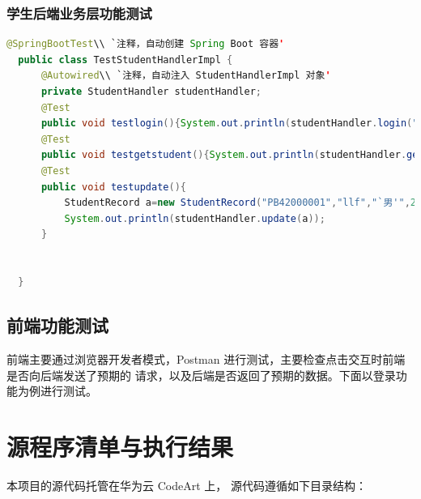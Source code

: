 \documentclass[12pt, a4paper]{article}
\begin{document}
\subsubsection{学生后端业务层功能测试}
\begin{lstlisting}[language=Java]
  @SpringBootTest\\ `注释，自动创建 Spring Boot 容器'
  public class TestStudentHandlerImpl {
      @Autowired\\ `注释，自动注入 StudentHandlerImpl 对象'
      private StudentHandler studentHandler;
      @Test
      public void testlogin(){System.out.println(studentHandler.login("PB42000001","123456"));}
      @Test
      public void testgetstudent(){System.out.println(studentHandler.getStudent("PB42000001"));}
      @Test
      public void testupdate(){
          StudentRecord a=new StudentRecord("PB42000001","llf","`男'",21,"cs","123456");
          System.out.println(studentHandler.update(a));
      }
  
  
  }

\end{lstlisting}

\subsection{前端功能测试}
前端主要通过浏览器开发者模式，Postman 进行测试，主要检查点击交互时前端是否向后端发送了预期的
请求，以及后端是否返回了预期的数据。下面以登录功能为例进行测试。




\section{源程序清单与执行结果}
本项目的源代码托管在华为云 CodeArt 上， 源代码遵循如下目录结构：
\newpage
\end{document}
